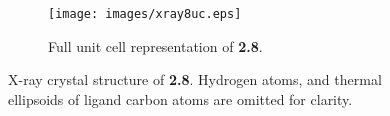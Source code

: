 \begin{figure}[!ht]
\begin{subfigure}[b]{0.49\textwidth}
 \end{subfigure}
 \begin{subfigure}[b]{\textwidth}
  \centering
  \texttt{[image: images/xray8uc.eps]}
  \caption{Full unit cell representation of \textbf{2.8}.}
 \end{subfigure}
\caption[X-ray crystal structure of \textbf{2.8}.]{X-ray crystal structure of \textbf{2.8}. Hydrogen atoms, and thermal ellipsoids of ligand carbon atoms are omitted for clarity.}
\label{fig.xray28}
\end{figure}